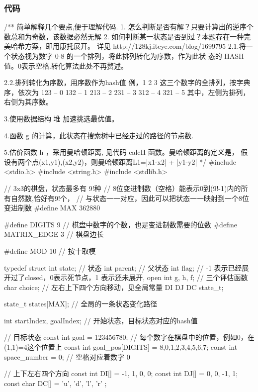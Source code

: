 \subsubsection{代码}
\begin{Codex}[label=eight_digits_astar.c]
/**
 简单解释几个要点,便于理解代码.
 1. 怎么判断是否有解？只要计算出的逆序个数总和为奇数，该数据必然无解
 2. 如何判断某一状态是否到过？本题存在一种完美哈希方案，即用康托展开。
    详见 http://128kj.iteye.com/blog/1699795
    2.1.将一个状态视为数字 0-8 的一个排列，将此排列转化为序数，作为此状
 态的 HASH 值。0表示空格.转化算法此处不再赘述。

    2.2.排列转化为序数，用序数作为hash值
    例，1 2 3 这三个数字的全排列，按字典序，依次为
 123 -- 0
 132 -- 1
 213 -- 2
 231 -- 3
 312 -- 4
 321 -- 5
 其中，左侧为排列，右侧为其序数。
 
 3.使用数据结构 堆 加速挑选最优值。
 
 4.函数 g 的计算，此状态在搜索树中已经走过的路径的节点数.
 
 5.估价函数 h ，采用曼哈顿距离, 见代码 calcH 函数。曼哈顿距离的定义是，
 假设有两个点(x1,y1),(x2,y2)，则曼哈顿距离L1=|x1-x2| + |y1-y2|
 */
#include <stdio.h>
#include <string.h>
#include <stdlib.h>

// 3x3的棋盘，状态最多有 9!种
// 8位变进制数（空格）能表示0到(9!-1)内的所有自然数,恰好有9!个，
// 与状态一一对应，因此可以把状态一一映射到一个8位变进制数
#define     MAX         362880

#define DIGITS 9 // 棋盘中数字的个数，也是变进制数需要的位数
#define     MATRIX_EDGE 3       // 棋盘边长

#define     MOD         10      // 按十取模

typedef struct {
    int state; // 状态
    int parent;     // 父状态
    int flag;   // -1 表示已经展开过了closed，0表示死节点，1 表示还未展开, open
    int g, h, f; // 三个评估函数
    char choice;  // 左右上下四个方向移动，见全局常量 DI DJ DC
} state_t;

state_t states[MAX];  // 全局的一条状态变化路径

int  startIndex, goalIndex; // 开始状态，目标状态对应的hash值

// 目标状态
const int goal = 123456780;
// 每个数字在棋盘中的位置，例如0，在(1,1)=4这个位置上
const int goal_pos[DIGITS] = {8,0,1,2,3,4,5,6,7};
const int space_number = 0; // 空格对应着数字 0

// 上下左右四个方向
const int DI[] = {-1, 1, 0, 0};
const int DJ[] = {0, 0, -1, 1};
const char DC[] = { 'u', 'd', 'l', 'r' };


\end{Codex}
